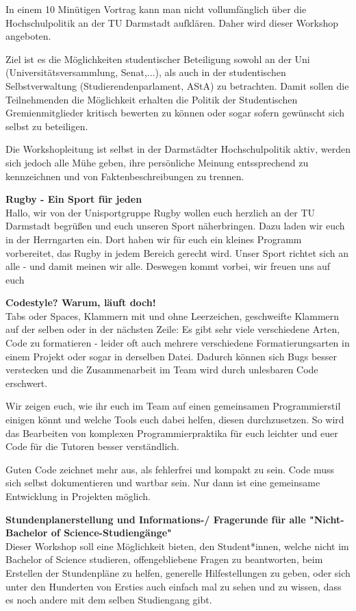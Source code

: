 {In einem 10 Minütigen Vortrag kann man nicht vollumfänglich
über die Hochschulpolitik an der TU Darmstadt aufklären.
Daher wird dieser Workshop angeboten.

Ziel ist es die Möglichkeiten studentischer Beteiligung
sowohl an der Uni (Universitätsversammlung, Senat,...),
als auch in der studentischen Selbstverwaltung
(Studierendenparlament, AStA) zu betrachten.
Damit sollen die Teilnehmenden die Möglichkeit erhalten
die Politik der Studentischen Gremienmitglieder kritisch
bewerten zu können oder sogar sofern gewünscht sich
selbst zu beteiligen.

Die Workshopleitung ist selbst in der Darmstädter Hochschulpolitik
aktiv, werden sich jedoch alle Mühe geben, ihre persönliche Meinung
entssprechend zu kennzeichnen und von Faktenbeschreibungen zu
trennen.

\textbf{Rugby - Ein Sport für jeden}\\
Hallo, wir von der Unisportgruppe Rugby wollen euch herzlich an der TU Darmstadt begrüßen und euch unseren Sport näherbringen. 
Dazu laden wir euch in der Herrngarten ein. Dort haben wir für euch ein kleines Programm vorbereitet, das Rugby in jedem Bereich gerecht wird. Unser Sport richtet sich an alle - und damit meinen wir alle. Deswegen kommt vorbei, wir freuen uns auf euch

\textbf{Codestyle? Warum, läuft doch!}\\
Tabs oder Spaces, Klammern mit und ohne Leerzeichen, geschweifte Klammern auf der selben oder in der nächsten Zeile: Es gibt sehr viele verschiedene Arten, Code zu formatieren - leider oft auch mehrere verschiedene Formatierungsarten in einem Projekt oder sogar in derselben Datei. Dadurch können sich Bugs besser verstecken und die Zusammenarbeit im Team wird durch unlesbaren Code erschwert. 

Wir zeigen euch, wie ihr euch im Team auf einen gemeinsamen Programmierstil einigen könnt und welche Tools euch dabei helfen, diesen durchzusetzen. So wird das Bearbeiten von komplexen Programmierpraktika für euch leichter und euer Code für die Tutoren besser verständlich. 

Guten Code zeichnet mehr aus, als fehlerfrei und kompakt zu sein. Code muss sich selbst dokumentieren und wartbar sein. Nur dann ist eine gemeinsame Entwicklung in Projekten möglich.

\textbf{Stundenplanerstellung und Informations-/ Fragerunde für alle "Nicht-Bachelor of Science-Studiengänge"}\\
Dieser Workshop soll eine Möglichkeit bieten, den Student*innen, welche nicht im Bachelor of Science studieren, offengebliebene Fragen zu beantworten, beim Erstellen der Stundenpläne zu helfen, generelle Hilfestellungen zu geben, oder sich unter den Hunderten von Ersties auch einfach mal zu sehen und zu wissen, dass es noch andere mit dem selben Studiengang gibt.
}{}

